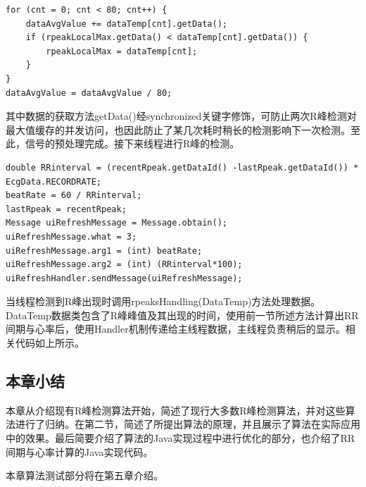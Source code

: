 \begin{center}
\begin{lstlisting}
for (cnt = 0; cnt < 80; cnt++) {
    dataAvgValue += dataTemp[cnt].getData();
    if (rpeakLocalMax.getData() < dataTemp[cnt].getData()) {
        rpeakLocalMax = dataTemp[cnt];
    }
}
dataAvgValue = dataAvgValue / 80;
\end{lstlisting}
\end{center}

其中数据的获取方法getData()经synchronized关键字修饰，可防止两次R峰检测对最大值缓存的并发访问，也因此防止了某几次耗时稍长的检测影响下一次检测。至此，信号的预处理完成。接下来线程进行R峰的检测。

\begin{center}
\begin{lstlisting}
double RRinterval = (recentRpeak.getDataId() -lastRpeak.getDataId()) * EcgData.RECORDRATE;
beatRate = 60 / RRinterval;
lastRpeak = recentRpeak;
Message uiRefreshMessage = Message.obtain();
uiRefreshMessage.what = 3;
uiRefreshMessage.arg1 = (int) beatRate;
uiRefreshMessage.arg2 = (int) (RRinterval*100);
uiRefreshHandler.sendMessage(uiRefreshMessage);
\end{lstlisting}
\end{center}
当线程检测到R峰出现时调用rpeaksHandling(DataTemp)方法处理数据。DataTemp数据类包含了R峰峰值及其出现的时间，使用前一节所述方法计算出RR间期与心率后，使用Handler机制传递给主线程数据，主线程负责稍后的显示。相关代码如上所示。

\subsection{本章小结}
本章从介绍现有R峰检测算法开始，简述了现行大多数R峰检测算法，并对这些算法进行了归纳。在第二节，简述了所提出算法的原理，并且展示了算法在实际应用中的效果。最后简要介绍了算法的Java实现过程中进行优化的部分，也介绍了RR间期与心率计算的Java实现代码。

本章算法测试部分将在第五章介绍。
